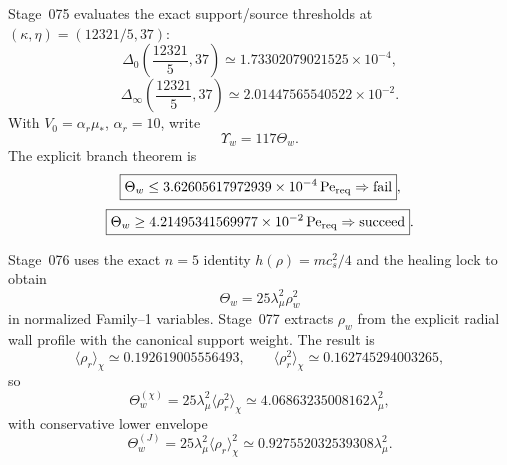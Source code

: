 Stage~075 evaluates the exact support/source thresholds at \((\kappa,
\eta)=(12321/5,37)\):
\begin{equation}
\label{eq:part03-family1-deltas}
\Delta_0\left(\frac{12321}{5},37\right)
\simeq1.73302079021525\times10^{-4},
\end{equation}
\begin{equation}
\label{eq:part03-family1-deltainf}
\Delta_\infty\left(\frac{12321}{5},37\right)
\simeq2.01447565540522\times10^{-2}.
\end{equation}
With \(V_0=\alpha_r\mu_*\), \(\alpha_r=10\), write
\begin{equation}
\label{eq:part03-theta-def}
\Upsilon_w=117\Theta_w.
\end{equation}
The explicit branch theorem is
\begin{equation}
\label{eq:part03-theta-window}
\boxed{
\Theta_w\leq3.62605617972939\times10^{-4}\,\mathrm{Pe}_{\rm req}
\Rightarrow\text{fail}},
\end{equation}
\begin{equation}
\label{eq:part03-theta-window-suff}
\boxed{
\Theta_w\geq4.21495341569977\times10^{-2}\,\mathrm{Pe}_{\rm req}
\Rightarrow\text{succeed}}.
\end{equation}

Stage~076 uses the exact \(n=5\) identity \(h(\rho)=mc_s^2/4\) and the healing lock to obtain
\begin{equation}
\label{eq:part03-theta-rho}
\Theta_w=25\lambda_\mu^2\rho_w^2
\end{equation}
in normalized Family--1 variables.  Stage~077 extracts \(\rho_w\) from the explicit radial wall profile with the canonical support weight.  The result is
\begin{equation}
\label{eq:part03-rho-averages}
\langle\rho_r\rangle_\chi\simeq0.192619005556493,
\qquad
\langle\rho_r^2\rangle_\chi\simeq0.162745294003265,
\end{equation}
so
\begin{equation}
\label{eq:part03-theta-values}
\boxed{
\Theta_w^{(\chi)}=25\lambda_\mu^2\langle\rho_r^2\rangle_\chi
\simeq4.06863235008162\lambda_\mu^2},
\end{equation}
with conservative lower envelope
\begin{equation}
\label{eq:part03-theta-J-value}
\boxed{
\Theta_w^{(J)}=25\lambda_\mu^2\langle\rho_r\rangle_\chi^2
\simeq0.927552032539308\lambda_\mu^2}.
\end{equation}

